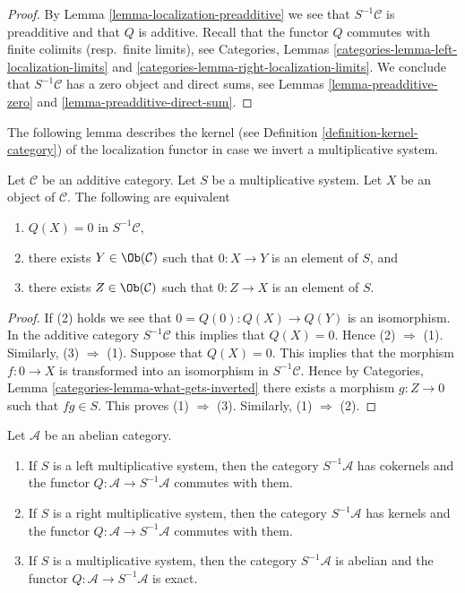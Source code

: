 \begin{proof}
By
Lemma \ref{lemma-localization-preadditive}
we see that $S^{-1}\mathcal{C}$ is preadditive and that $Q$ is additive.
Recall that the functor $Q$ commutes with finite colimits
(resp.\ finite limits), see
Categories, Lemmas \ref{categories-lemma-left-localization-limits} and
\ref{categories-lemma-right-localization-limits}.
We conclude that $S^{-1}\mathcal{C}$ has a zero object and
direct sums, see
Lemmas \ref{lemma-preadditive-zero} and
\ref{lemma-preadditive-direct-sum}.
\end{proof}

\noindent
The following lemma describes the kernel (see
Definition \ref{definition-kernel-category})
of the localization functor in case we invert a multiplicative system.

\begin{lemma}
\label{lemma-kernel-localization}
Let $\mathcal{C}$ be an additive category. Let $S$ be a multiplicative
system. Let $X$ be an object
of $\mathcal{C}$. The following are equivalent
\begin{enumerate}
\item $Q(X) = 0$ in $S^{-1}\mathcal{C}$,
\item there exists $Y \in \Ob(\mathcal{C})$ such that
$0 : X \to Y$ is an element of $S$, and
\item there exists $Z \in \Ob(\mathcal{C})$ such that
$0 : Z \to X$ is an element of $S$.
\end{enumerate}
\end{lemma}

\begin{proof}
If (2) holds we see that $0 = Q(0) : Q(X) \to Q(Y)$ is an isomorphism.
In the additive category $S^{-1}\mathcal{C}$ this implies that $Q(X) = 0$.
Hence (2) $\Rightarrow$ (1). Similarly, (3) $\Rightarrow$ (1).
Suppose that $Q(X) = 0$. This implies that the morphism
$f : 0 \to X$ is transformed into an isomorphism in $S^{-1}\mathcal{C}$.
Hence by
Categories, Lemma \ref{categories-lemma-what-gets-inverted}
there exists a morphism $g : Z \to 0$ such that $fg \in S$. This proves
(1) $\Rightarrow$ (3). Similarly, (1) $\Rightarrow$ (2).
\end{proof}

\begin{lemma}
\label{lemma-localization-abelian}
Let $\mathcal{A}$ be an abelian category.
\begin{enumerate}
\item If $S$ is a left multiplicative system, then
the category $S^{-1}\mathcal{A}$ has cokernels and the functor
$Q : \mathcal{A} \to S^{-1}\mathcal{A}$ commutes with them.
\item If $S$ is a right multiplicative system, then
the category $S^{-1}\mathcal{A}$ has kernels and the functor
$Q : \mathcal{A} \to S^{-1}\mathcal{A}$ commutes with them.
\item If $S$ is a multiplicative system, then the category
$S^{-1}\mathcal{A}$ is abelian and the functor
$Q : \mathcal{A} \to S^{-1}\mathcal{A}$ is exact.
\end{enumerate}
\end{lemma}

